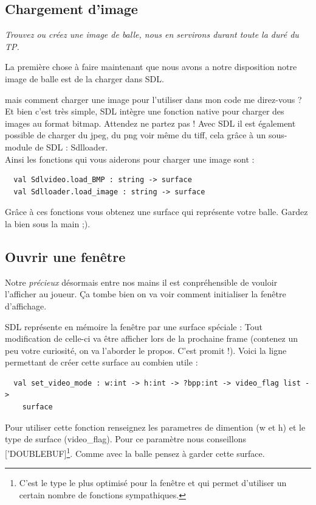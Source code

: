 \documentclass[a4paper]{article}
\begin{document}
\subsection{Chargement d'image}
\textit{Trouvez ou créez une image de balle, nous en servirons durant toute la duré du TP.}\par\bigskip

La première chose à faire maintenant que nous avons a notre disposition notre image de balle est de la charger dans SDL.\par
mais comment charger une image pour l'utiliser dans mon code me direz-vous ?
Et bien c'est très simple, SDL intègre une fonction native pour charger des images au format bitmap. Attendez ne partez pas ! Avec SDL il est également possible de charger du jpeg, du png voir même du tiff, cela grâce à un sous-module de SDL : Sdlloader.\\\smallskip
Ainsi les fonctions qui vous aiderons pour charger une image sont :

\begin{lstlisting}
  val Sdlvideo.load_BMP : string -> surface
  val Sdlloader.load_image : string -> surface
\end{lstlisting}

Grâce à ces fonctions vous obtenez une surface qui représente votre balle. Gardez la bien sous la main ;).

\subsection{Ouvrir une fenêtre}
Notre \textit{précieux} désormais entre nos mains il est conpréhensible de vouloir l'afficher au joueur. Ça tombe bien on va voir comment initialiser la fenêtre d'affichage.

SDL représente en mémoire la fenêtre par une surface spéciale : Tout modification de celle-ci va être afficher lors de la prochaine frame (contenez un peu votre curiosité, on va l'aborder le propos. C'est promit !). Voici la ligne permettant de créer cette surface au combien utile :

\begin{lstlisting}
  val set_video_mode : w:int -> h:int -> ?bpp:int -> video_flag list -> 
    surface
\end{lstlisting}

Pour utiliser cette fonction renseignez les parametres de dimention (w et h) et le type de surface (video\_flag). Pour ce paramètre nous conseillons ['DOUBLEBUF]\footnote{C'est le type le plus optimisé pour la fenêtre et qui permet d'utiliser un certain nombre de fonctions sympathiques.}. Comme avec la balle pensez à garder cette surface.
\end{document}
